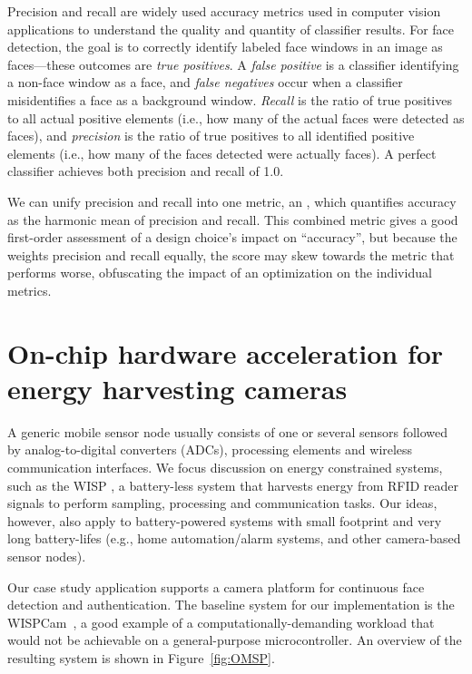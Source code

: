 Precision and recall are widely used accuracy metrics used in computer vision applications to understand the quality and quantity of classifier results. For face detection, the goal is to correctly identify labeled face windows in an image as faces---these outcomes are \textit{true positives}. A \textit{false positive} is a classifier identifying a non-face window as a face, and \textit{false negatives} occur when a classifier misidentifies a face as a background window. \emph{Recall} is the ratio of true positives to all actual positive elements (i.e., how many of the actual faces were detected as faces), and \emph{precision} is the ratio of true positives to all identified positive elements (i.e., how many of the faces detected were actually faces). A perfect classifier achieves both precision and recall of 1.0.

We can unify precision and recall into one metric, an \textit{\fscore}, which quantifies accuracy as the harmonic mean of precision and recall.
This combined metric
gives a good first-order assessment of a design choice's impact on ``accuracy'', but because the \fscore  weights precision and recall equally, the score may skew towards the metric that performs worse, obfuscating the impact of an optimization on the individual metrics.

\section{On-chip hardware acceleration for energy harvesting cameras}

A generic mobile sensor node usually consists of one or several sensors followed by analog-to-digital converters (ADCs), processing elements and wireless communication interfaces. We focus discussion on energy constrained systems, such as the WISP \cite{wisp}, a battery-less system that  harvests energy from RFID reader signals to perform sampling, processing and communication tasks. Our ideas, however, also apply to battery-powered systems with small footprint and very long battery-lifes (e.g., home automation/alarm systems, and other camera-based sensor nodes).

Our case study application supports a camera platform for continuous face detection and authentication. The baseline system for our implementation is the WISPCam~\cite{wispcam}, a good example of a computationally-demanding workload that would not be achievable on a general-purpose microcontroller.
An overview of the resulting system is shown in Figure~\ref{fig:OMSP}.

